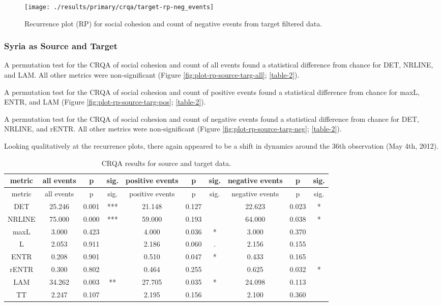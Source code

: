 \documentclass[english,man]{apa6}
\begin{document}
\begin{figure}
\texttt{[image: ./results/primary/crqa/target-rp-neg\_events]} \caption{Recurrence plot (RP) for social cohesion and count of negative events from target filtered data.}\label{fig:plot-rp-targ-neg}
\end{figure}

\hypertarget{syria-as-source-and-target}{%
\subsubsection{Syria as Source and Target}\label{syria-as-source-and-target}}

A permutation test for the CRQA of social cohesion and count of all
events found a statistical difference from chance for DET, NRLINE, and
LAM. All other metrics were non-significant (Figure
\ref{fig:plot-rp-source-targ-all}; \autoref{table-2}).

A permutation test for the CRQA of social cohesion and count of positive
events found a statistical difference from chance for maxL, ENTR, and LAM
(Figure \ref{fig:plot-rp-source-targ-pos}; \autoref{table-2}).

A permutation test for the CRQA of social cohesion and count of negative
events found a statistical difference from chance for DET, NRLINE, and rENTR.
All other metrics were non-significant (Figure
\ref{fig:plot-rp-source-targ-neg}; \autoref{table-2}).

Looking qualitatively at the recurrence plots, there again appeared
to be a shift in dynamics around the 36th observation (May 4th, 2012).

\begin{longtable}[]{@{}cccccccccc@{}}
\caption{\label{table-2}CRQA results for source and target data.}\tabularnewline
\toprule
metric & all events & p & sig. & positive events & p & sig. & negative events & p & sig.\tabularnewline
\midrule
\endfirsthead
\toprule
metric & all events & p & sig. & positive events & p & sig. & negative events & p & sig.\tabularnewline
\midrule
\endhead
DET & 25.246 & 0.001 & *** & 21.148 & 0.127 & & 22.623 & 0.023 & *\tabularnewline
NRLINE & 75.000 & 0.000 & *** & 59.000 & 0.193 & & 64.000 & 0.038 & *\tabularnewline
maxL & 3.000 & 0.423 & & 4.000 & 0.036 & * & 3.000 & 0.370 &\tabularnewline
L & 2.053 & 0.911 & & 2.186 & 0.060 & . & 2.156 & 0.155 &\tabularnewline
ENTR & 0.208 & 0.901 & & 0.510 & 0.047 & * & 0.433 & 0.165 &\tabularnewline
rENTR & 0.300 & 0.802 & & 0.464 & 0.255 & & 0.625 & 0.032 & *\tabularnewline
LAM & 34.262 & 0.003 & ** & 27.705 & 0.035 & * & 24.098 & 0.113 &\tabularnewline
TT & 2.247 & 0.107 & & 2.195 & 0.156 & & 2.100 & 0.360 &\tabularnewline
\bottomrule
\end{longtable}
\end{document}
